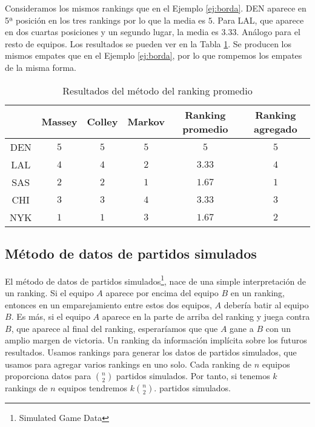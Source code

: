 \begin{ejemplo}
Consideramos los mismos rankings que en el Ejemplo \ref{ej:borda}. DEN aparece en 5ª posición en los tres rankings por lo que la media es $5$. Para LAL, que aparece en dos cuartas posiciones y un segundo lugar, la media es $3.33$. Análogo para el resto de equipos. Los resultados se pueden ver en la Tabla \ref{tbl:promedio_resultados}. Se producen los mismos empates que en el Ejemplo \ref{ej:borda}, por lo que rompemos los empates de la misma forma.

\begin{table}[h]
\centering
\caption{Resultados del método del ranking promedio}
\label{tbl:promedio_resultados}
\begin{tabular}{@{}cccccc@{}}
\cmidrule(l){2-6}
    & Massey & Colley & Markov & Ranking promedio & Ranking agregado \\ \midrule
DEN & $5$    & $5$    & $5$    & $5$              & $5$              \\
LAL & $4$    & $4$    & $2$    & $3.33$           & $4$              \\
SAS & $2$    & $2$    & $1$    & $1.67$           & $1$              \\
CHI & $3$    & $3$    & $4$    & $3.33$           & $3$              \\
NYK & $1$    & $1$    & $3$    & $1.67$           & $2$              \\ \bottomrule
\end{tabular}
\end{table}

\end{ejemplo}


\subsection{Método de datos de partidos simulados}

El método de datos de partidos simulados\footnote{Simulated Game Data}, nace de una simple interpretación de un ranking. Si el equipo $A$ aparece por encima del equipo $B$ en un ranking, entonces en un emparejamiento entre estos dos equipos, $A$ debería batir al equipo $B$. Es más, si el equipo $A$ aparece en la parte de arriba del ranking y juega contra $B$, que aparece al final del ranking, esperaríamos que que $A$ gane a $B$ con un amplio margen de victoria. Un ranking da información implícita sobre los futuros resultados. Usamos rankings para generar los datos de partidos simulados, que usamos para agregar varios rankings en uno solo. Cada ranking de $n$ equipos proporciona datos para $\binom{n}{2}$ partidos simulados. Por tanto, si tenemos $k$ rankings de $n$ equipos tendremos $k \binom{n}{2}$. partidos simulados.\\

